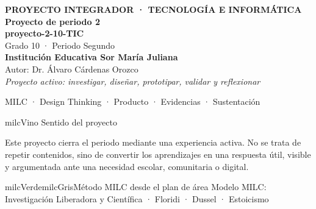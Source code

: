 \documentclass[11pt,letterpaper]{article}
\begin{document}
\thispagestyle{empty}

\vspace*{.85cm}
\begin{tcolorbox}[
  enhanced,colback=milcVino,colframe=milcVino,arc=12mm,width=.86\textwidth,
  boxrule=0pt,left=12mm,right=12mm,top=11mm,bottom=11mm,center,
  overlay={\draw[milcMagenta,line width=2pt,dash pattern=on 9pt off 8pt,rounded corners=10mm]
  ([xshift=7mm,yshift=-7mm]frame.north west) rectangle ([xshift=-7mm,yshift=7mm]frame.south east);}]
  \centering
  {\sffamily\bfseries\color{white}\fontsize{15}{17}\selectfont PROYECTO INTEGRADOR · TECNOLOGÍA E INFORMÁTICA}\\[1.0cm]
  {\sffamily\bfseries\color{white}\fontsize{30}{33}\selectfont Proyecto de periodo 2}\\[3mm]
  {\sffamily\bfseries\color{milcMostaza}\fontsize{25}{28}\selectfont proyecto-2-10-TIC}\\[8mm]
  {\sffamily\color{white}\Large Grado 10 · Periodo Segundo}\\[1.0cm]
  {\sffamily\bfseries\color{white}\large Institución Educativa Sor María Juliana}\\[2mm]
  {\sffamily\color{white}Autor: Dr. Álvaro Cárdenas Orozco}\\[4mm]
  {\sffamily\itshape\color{white}Proyecto activo: investigar, diseñar, prototipar, validar y reflexionar}
\end{tcolorbox}
\vfill
\begin{tcolorbox}[enhanced,colback=milcVino!72!black,colframe=milcVino!72!black,arc=5mm,boxrule=0pt,width=.86\textwidth,left=6mm,right=6mm,top=4mm,bottom=4mm,center]
{\color{white}\sffamily\small MILC · Design Thinking · Producto · Evidencias · Sustentación}
\end{tcolorbox}

\newpage
\begin{titlebox}{milcVino}
Sentido del proyecto
\end{titlebox}
\begin{multicols}{2}
Este proyecto cierra el periodo mediante una experiencia activa. No se trata de repetir contenidos, sino de convertir los aprendizajes en una respuesta útil, visible y argumentada ante una necesidad escolar, comunitaria o digital.

\columnbreak
\begin{softbox}{milcVerde}{milcGris}{Método MILC desde el plan de área}
Modelo MILC: Investigación Liberadora y Científica · Floridi · Dussel · Estoicismo
\end{softbox}
\end{multicols}
\end{document}
